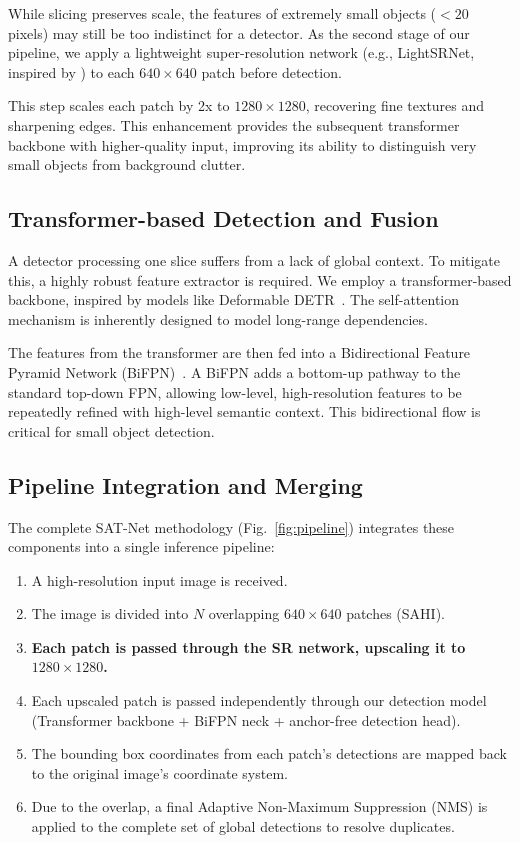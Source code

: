 While slicing preserves scale, the features of extremely small objects ($<20$ pixels) may still be too indistinct for a detector. As the second stage of our pipeline, we apply a lightweight super-resolution network (e.g., LightSRNet, inspired by \cite{li2025superresolution}) to each $640 \times 640$ patch before detection.

This step scales each patch by 2x to $1280 \times 1280$, recovering fine textures and sharpening edges. This enhancement provides the subsequent transformer backbone with higher-quality input, improving its ability to distinguish very small objects from background clutter.

\subsection{Transformer-based Detection and Fusion}

A detector processing one slice suffers from a lack of global context. To mitigate this, a highly robust feature extractor is required. We employ a transformer-based backbone, inspired by models like Deformable DETR~\cite{zhu2021deformable}. The self-attention mechanism is inherently designed to model long-range dependencies.

The features from the transformer are then fed into a Bidirectional Feature Pyramid Network (BiFPN)~\cite{tan2020efficientdet}. A BiFPN adds a bottom-up pathway to the standard top-down FPN, allowing low-level, high-resolution features to be repeatedly refined with high-level semantic context. This bidirectional flow is critical for small object detection.

\subsection{Pipeline Integration and Merging}

The complete SAT-Net methodology (Fig.~\ref{fig:pipeline}) integrates these components into a single inference pipeline:
\begin{enumerate}
    \item A high-resolution input image is received.
    \item The image is divided into $N$ overlapping $640 \times 640$ patches (SAHI).
    \item \textbf{Each patch is passed through the SR network, upscaling it to $1280 \times 1280$.}
    \item Each upscaled patch is passed independently through our detection model (Transformer backbone + BiFPN neck + anchor-free detection head).
    \item The bounding box coordinates from each patch's detections are mapped back to the original image's coordinate system.
    \item Due to the overlap, a final Adaptive Non-Maximum Suppression (NMS) is applied to the complete set of global detections to resolve duplicates.
\end{enumerate}